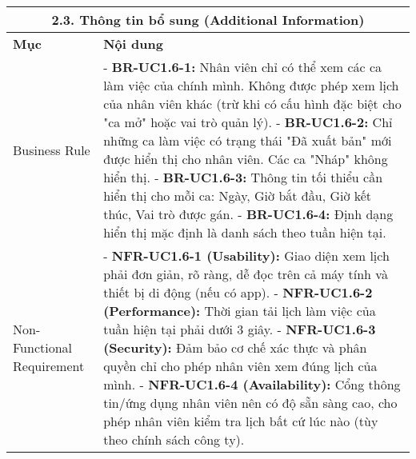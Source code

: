 \begin{longtable}{|m{4cm}|p{11cm}|}
\hline
\multicolumn{2}{|c|}{\textbf{2.3. Thông tin bổ sung (Additional Information)}} \\
\hline
\textbf{Mục} & \textbf{Nội dung} \\
\hline
Business Rule & - \textbf{BR-UC1.6-1:} Nhân viên chỉ có thể xem các ca làm việc của chính mình. Không được phép xem lịch của nhân viên khác (trừ khi có cấu hình đặc biệt cho "ca mở" hoặc vai trò quản lý). \newline - \textbf{BR-UC1.6-2:} Chỉ những ca làm việc có trạng thái "Đã xuất bản" mới được hiển thị cho nhân viên. Các ca "Nháp" không hiển thị. \newline - \textbf{BR-UC1.6-3:} Thông tin tối thiểu cần hiển thị cho mỗi ca: Ngày, Giờ bắt đầu, Giờ kết thúc, Vai trò được gán. \newline - \textbf{BR-UC1.6-4:} Định dạng hiển thị mặc định là danh sách theo tuần hiện tại. \\
\hline
Non-Functional Requirement & - \textbf{NFR-UC1.6-1 (Usability):} Giao diện xem lịch phải đơn giản, rõ ràng, dễ đọc trên cả máy tính và thiết bị di động (nếu có app). \newline - \textbf{NFR-UC1.6-2 (Performance):} Thời gian tải lịch làm việc của tuần hiện tại phải dưới 3 giây. \newline - \textbf{NFR-UC1.6-3 (Security):} Đảm bảo cơ chế xác thực và phân quyền chỉ cho phép nhân viên xem đúng lịch của mình. \newline - \textbf{NFR-UC1.6-4 (Availability):} Cổng thông tin/ứng dụng nhân viên nên có độ sẵn sàng cao, cho phép nhân viên kiểm tra lịch bất cứ lúc nào (tùy theo chính sách công ty). \\
\hline

\end{longtable}

